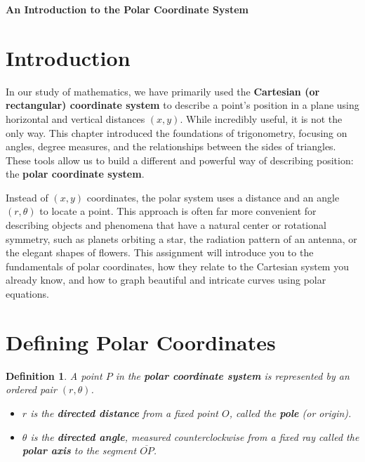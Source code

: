 \documentclass[12pt]{article}
\newtheorem{definition}{Definition}
\begin{document}
\begin{center}
\textbf{\Large An Introduction to the Polar Coordinate System} \\
\vspace{0.5cm}
\hspace{0.1\textwidth}
\end{center}

\vspace{0.5cm}

\section{Introduction}

In our study of mathematics, we have primarily used the \textbf{Cartesian (or rectangular) coordinate system} to describe a point's position in a plane using horizontal and vertical distances $(x, y)$. While incredibly useful, it is not the only way. This chapter introduced the foundations of trigonometry, focusing on angles, degree measures, and the relationships between the sides of triangles. These tools allow us to build a different and powerful way of describing position: the \textbf{polar coordinate system}.

Instead of $(x,y)$ coordinates, the polar system uses a distance and an angle $(r, \theta)$ to locate a point. This approach is often far more convenient for describing objects and phenomena that have a natural center or rotational symmetry, such as planets orbiting a star, the radiation pattern of an antenna, or the elegant shapes of flowers. This assignment will introduce you to the fundamentals of polar coordinates, how they relate to the Cartesian system you already know, and how to graph beautiful and intricate curves using polar equations.

\section{Defining Polar Coordinates}

\begin{definition}
A point $P$ in the \textbf{polar coordinate system} is represented by an ordered pair $(r, \theta)$.
\begin{itemize}
    \item $r$ is the \textbf{directed distance} from a fixed point $O$, called the \textbf{pole} (or origin).
    \item $\theta$ is the \textbf{directed angle}, measured counterclockwise from a fixed ray called the \textbf{polar axis} to the segment $\overline{OP}$.
\end{itemize}
\end{definition}
\end{document}
